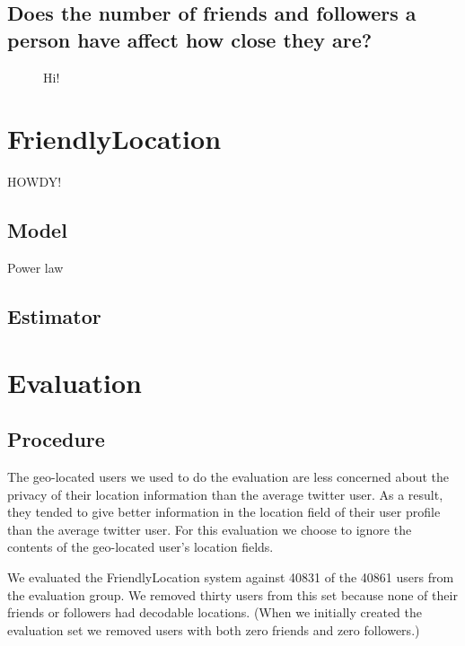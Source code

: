 \documentclass{sig-alternate}
\begin{document}
\subsection{Does the number of friends and followers a person have affect how close they are?}

\begin{figure*}
\centering
{}
\caption{
Hi!
}
\label{fig:LocalAll}
\end{figure*}


\section{FriendlyLocation}
HOWDY!
\subsection{Model}
\label{sec:model}

Power law
\begin{figure}
\centering
{}
\caption{}
\label{fig:EdgeTypesMdist}
\end{figure}
\subsection{Estimator}



\section{Evaluation}
\subsection{Procedure}
The geo-located users we used to do the evaluation are less concerned about the
privacy of their location information than the average twitter user.
As a result, they tended to give better information in the location field of
their user profile than the average twitter user.
For this evaluation we choose to ignore the contents of the geo-located user's
location fields.

We evaluated the FriendlyLocation system against 40831 of the 40861 users from the evaluation group.
We removed thirty users from this set because none of their friends or
followers had decodable locations.
(When we initially created the evaluation
set we removed users with both zero friends and zero followers.)
\end{document}
